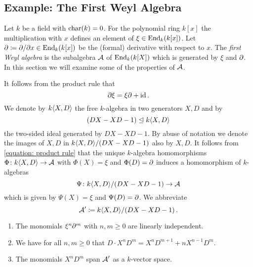 \subsection{Example: The First Weyl Algebra}
\label{subsection: first weyl algebra}


\begin{fluff}
  Let $k$ be a field with $\operatorname{char}(k) = 0$.
  For the polynomial ring $k[x]$ the multiplication with $x$ defines an element of $\xi \in \operatorname{End}_k(k[x])$.
  Let $\partial \coloneqq \partial/\partial x \in \operatorname{End}_k(k[x])$ be the (formal) derivative with respect to $x$.
  The \emph{first Weyl algebra} is the subalgebra $\operatorname{\mathcal{A}}$ of $\operatorname{End}_k(k[X])$ which is generated by $\xi$ and $\partial$.
  In this section we will examine some of the properties of $\operatorname{\mathcal{A}}$.
\end{fluff}


\begin{fluff}
  It follows from the product rule that
  \begin{equation}
  \label{equation: product rule}
      \partial \xi
    = \xi \partial + {\operatorname{id}} \,.
  \end{equation}
  We denote by $k\langle X,D \rangle$ the free $k$-algebra in two generators $X,D$ and by
  \[
              (DX - XD - 1)
    \trianglelefteq k\langle X,D \rangle
  \]
  the two-sided ideal generated by $DX - XD - 1$.
  By abuse of notation we denote the images of $X, D$ in $k\langle X,D \rangle/(DX-XD-1)$ also by $X, D$.
  It follows from \eqref{equation: product rule} that the unique $k$-algebra homomorphisms $\Phi \colon k\langle X,D \rangle \to \operatorname{\mathcal{A}}$ with $\Phi(X) = \xi$ and $\Phi(D) = \partial$ induces a homomorphism of $k$-algebras
  \[
            \Psi
    \colon  k\langle X,D \rangle/(DX - XD - 1)
    \to     \operatorname{\mathcal{A}}
  \]
  which is given by $\Psi(X) = \xi$ and $\Psi(D) = \partial$.
  We abbreviate
  \[
              \operatorname{\mathcal{A}}'
    \coloneqq  k\langle X,D \rangle/(DX - XD - 1) \,.
  \]
\end{fluff}


\begin{lemma}
  \label{lemma: preparation for weyl basis}
  \leavevmode
  \begin{enumerate}
    \item
      The monomials $\xi^n \partial^m$ with $n, m \geq 0$ are linearly independent.
    \item
      \label{enumerate: weyl algebra more general formula}
      We have for all $n, m \geq 0$ that $D \cdot X^n D^m = X^n D^{m+1} + n X^{n-1} D^m$.
    \item
      The monomials $X^n D^m$ span $\operatorname{\mathcal{A}}'$ as a $k$-vector space.
  \end{enumerate}
\end{lemma}



